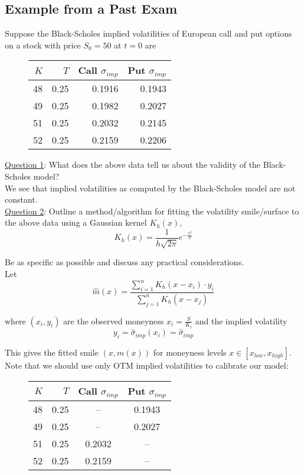 \documentclass[12pt]{article}
\newlength\tindent
\renewcommand{\indent}{\hspace*{\tindent}}
\begin{document}
\subsection{Example from a Past Exam}

\indent Suppose the Black-Scholes implied volatilities of European call and put options on a stock with price $S_0 = 50$ at $t = 0$ are
\begin{figure}[h!]
\centering
\begin{tabular}{r|r|r|r}
	$K$ & $T$ & Call $\sigma_{imp}$ & Put $\sigma_{imp}$ \\
	\hline
	48 & 0.25 & 0.1916 & 0.1943 \\
	49 & 0.25 & 0.1982 & 0.2027 \\
	51 & 0.25 & 0.2032 & 0.2145 \\
	52 & 0.25 & 0.2159 & 0.2206 \\
\end{tabular}
\end{figure}
\newline

\underline{Question 1}: What does the above data tell us about the validity of the Black-Scholes model? \\

We see that implied volatilities as computed by the Black-Scholes model are not constant. \\

\underline{Question 2}: Outline a method/algorithm for fitting the volatility smile/surface to the above data using a Gaussian kernel $K_h(x)$,
\begin{equation*}
	K_h(x) = \frac{1}{h\sqrt{2\pi}}e^{-\frac{x^2}{h}}
\end{equation*}

Be as specific as possible and discuss any practical considerations. \\

Let 
\begin{equation*}
	\hat{m}(x) = \frac{\sum^n_{i=1}K_h(x - x_i)\cdot y_i}{\sum^n_{j=1}K_h(x - x_j)}
\end{equation*}

where $(x_i,y_i)$ are the observed moneyness $x_i = \frac{S}{K_i}$ and the implied volatility
\begin{equation*}
	y_i = \hat{\sigma}_{imp}(x_i) = \hat{\sigma}_{imp} 
\end{equation*}

This gives the fitted smile $(x,m(x))$ for moneyness levels $x \in [x_{low},x_{high}]$. Note that we should use only OTM implied volatilities to calibrate our model:
\begin{figure}[h!]
\centering
\begin{tabular}{r|r|c|c}
	$K$ & $T$ & Call $\sigma_{imp}$ & Put $\sigma_{imp}$ \\
	\hline
	48 & 0.25 & -- & 0.1943 \\
	49 & 0.25 & -- & 0.2027 \\
	51 & 0.25 & 0.2032 & -- \\
	52 & 0.25 & 0.2159  & -- \\
\end{tabular}
\end{figure}
\end{document}

